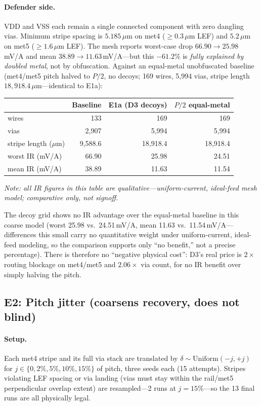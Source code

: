 \documentclass[11pt]{article}
\begin{document}
\paragraph{Defender side.} VDD and VSS each remain a single connected
component with zero dangling vias.  Minimum stripe spacing is
$5.185\,\mu\mathrm{m}$ on met4 ($\geq 0.3\,\mu\mathrm{m}$ LEF) and
$5.2\,\mu\mathrm{m}$ on met5 ($\geq 1.6\,\mu\mathrm{m}$ LEF).  The mesh
reports worst-case drop $66.90 \to 25.98$\,mV/A and mean $38.89 \to
11.63$\,mV/A---but this $-61.2\%$ is \emph{fully explained by doubled
metal}, not by obfuscation.  Against an equal-metal unobfuscated baseline
(met4/met5 pitch halved to $P/2$, no decoys; 169 wires, 5,994 vias,
stripe length $18{,}918.4\,\mu\mathrm{m}$---identical to E1a):

\begin{center}
\begin{tabular}{lrrr}
\toprule
 & Baseline & E1a (D3 decoys) & $P/2$ equal-metal \\
\midrule
wires & 133 & 169 & 169 \\
vias & 2,907 & 5,994 & 5,994 \\
stripe length ($\mu$m) & 9,588.6 & 18,918.4 & 18,918.4 \\
worst IR (mV/A) & 66.90 & 25.98 & 24.51 \\
mean IR (mV/A) & 38.89 & 11.63 & 11.54 \\
\bottomrule
\end{tabular}
\end{center}
\textit{Note: all IR figures in this table are qualitative---uniform-current,
ideal-feed mesh model; comparative only, not signoff.}

The decoy grid shows no IR advantage over the equal-metal baseline in
this coarse model (worst 25.98 vs.\ 24.51\,mV/A, mean 11.63 vs.\
11.54\,mV/A---differences this small carry no quantitative weight under
uniform-current, ideal-feed modeling, so the comparison supports only
``no benefit,'' not a precise percentage).  There is therefore no ``negative physical cost'':
D3's real price is $2\times$ routing blockage on met4/met5 and
$2.06\times$ via count, for no IR benefit over simply halving the pitch.

\subsection{E2: Pitch jitter (coarsens recovery, does not blind)}

\paragraph{Setup.} Each met4 stripe and its full via stack are translated
by $\delta \sim \mathrm{Uniform}(-j, +j)$ for $j \in \{0, 2\%, 5\%, 10\%,
15\%\}$ of pitch, three seeds each (15 attempts).  Stripes violating LEF
spacing or via landing (vias must stay within the rail/met5
perpendicular overlap extent) are resampled---2 runs at $j=15\%$---so
the 13 final runs are all physically legal.
\end{document}
